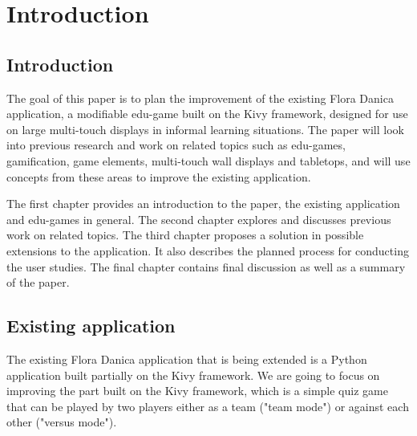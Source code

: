 
\chapter{Introduction}

\label{Chapter1}



\section{Introduction}

The goal of this paper is to plan the improvement of the existing Flora Danica application, a modifiable edu-game built on the Kivy framework\citep{Kivy}, designed for use on large multi-touch displays in informal learning situations. The paper will look into previous research and work on related topics such as edu-games, gamification, game elements, multi-touch wall displays and tabletops, and will use concepts from these areas to improve the existing application.

The first chapter provides an introduction to the paper, the existing application and edu-games in general. The second chapter explores and discusses previous work on related topics. The third chapter proposes a solution in possible extensions to the application. It also describes the planned process for conducting the user studies. The final chapter contains final discussion as well as a summary of the paper.


\section{Existing application}

The existing Flora Danica application that is being extended is a Python application built partially on the Kivy framework\citep{Kivy}. We are going to focus on improving the part built on the Kivy framework, which is a simple quiz game that can be played by two players either as a team ("team mode") or against each other ("versus mode").

